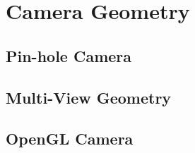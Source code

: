 \chapter{Camera Geometry}
\section{Pin-hole Camera}
\section{Multi-View Geometry}
\section{OpenGL Camera}
